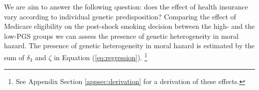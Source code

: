 \documentclass[11pt]{article}
\begin{document}
%
%
%

We are aim to answer the following question: does the effect of health insurance vary according to individual genetic predisposition?
Comparing the effect of Medicare eligibility on the post-shock smoking decision between the high- and the low-PGS groups we can assess the presence of genetic heterogeneity in moral hazard.
The presence of genetic heterogeneity in moral hazard is estimated by the sum of $\delta_3$ and $\zeta$ in Equation (\ref{eq:regression}).%
\footnote{See Appendix Section \ref{appsec:derivation} for a derivation of these effects.}
\end{document}
